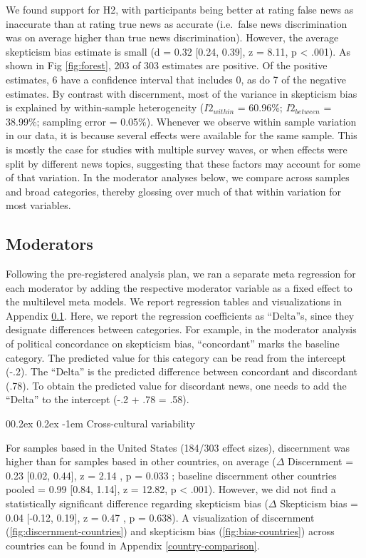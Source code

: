 \documentclass[
  man]{apa6}
\makeatletter
\let\oldparagraph\paragraph
\renewcommand{\paragraph}{
    \@ifstar
      \xxxParagraphStar
      \xxxParagraphNoStar
  }
\newcommand{\xxxParagraphStar}[1]{\oldparagraph*{#1}\mbox{}}
\newcommand{\xxxParagraphNoStar}[1]{\oldparagraph{#1}\mbox{}}
\renewcommand{\paragraph}{\@startsection{paragraph}{4}{\parindent}%
  {0\baselineskip \@plus 0.2ex \@minus 0.2ex}%
  {-1em}%
  {\normalfont\normalsize\bfseries\itshape\typesectitle}}
\makeatother
\begin{document}
We found support for H2, with participants being better at rating false news as inaccurate than at rating true news as accurate (i.e.~false news discrimination was on average higher than true news discrimination). However, the average skepticism bias estimate is small (d = 0.32 {[}0.24, 0.39{]}, z = 8.11, p \textless{} .001). As shown in Fig \ref{fig:forest}, 203 of 303 estimates are positive. Of the positive estimates, 6 have a confidence interval that includes 0, as do 7 of the negative estimates. By contrast with discernment, most of the variance in skepticism bias is explained by within-sample heterogeneity (\(I2_{within}\) = 60.96\%; \(I2_{between}\) = 38.99\%; sampling error = 0.05\%). Whenever we observe within sample variation in our data, it is because several effects were available for the same sample. This is mostly the case for studies with multiple survey waves, or when effects were split by different news topics, suggesting that these factors may account for some of that variation. In the moderator analyses below, we compare across samples and broad categories, thereby glossing over much of that within variation for most variables.

\subsection{Moderators}\label{moderators}

Following the pre-registered analysis plan, we ran a separate meta regression for each moderator by adding the respective moderator variable as a fixed effect to the multilevel meta models. We report regression tables and visualizations in Appendix \ref{moderators}. Here, we report the regression coefficients as ``Delta''s, since they designate differences between categories. For example, in the moderator analysis of political concordance on skepticism bias, ``concordant'' marks the baseline category. The predicted value for this category can be read from the intercept (-.2). The ``Delta'' is the predicted difference between concordant and discordant (.78). To obtain the predicted value for discordant news, one needs to add the ``Delta'' to the intercept (-.2 + .78 = .58).

\paragraph{Cross-cultural variability}\label{cross-cultural-variability}

For samples based in the United States (184/303 effect sizes), discernment was higher than for samples based in other countries, on average (\(\Delta\) Discernment = 0.23 {[}0.02, 0.44{]}, z = 2.14 , p = 0.033 ; baseline discernment other countries pooled = 0.99 {[}0.84, 1.14{]}, z = 12.82, p \textless{} .001). However, we did not find a statistically significant difference regarding skepticism bias (\(\Delta\) Skepticism bias = 0.04 {[}-0.12, 0.19{]}, z = 0.47 , p = 0.638). A visualization of discernment (\ref{fig:discernment-countries}) and skepticism bias (\ref{fig:bias-countries}) across countries can be found in Appendix \ref{country-comparison}.
\end{document}
